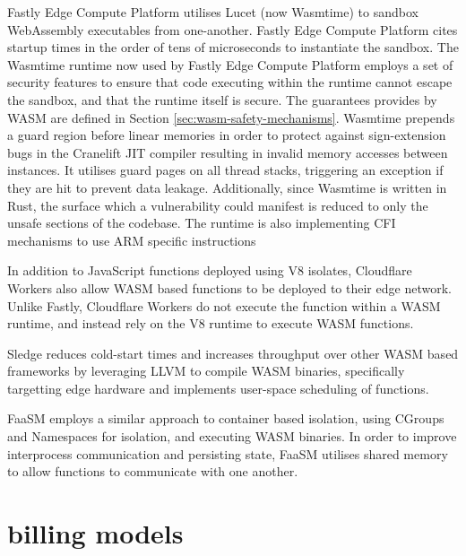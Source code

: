Fastly Edge Compute Platform\cite{EdgeCloudPlatform} utilises Lucet\cite{BytecodeallianceLucet2024} (now Wasmtime\cite{Wasmtime}) to sandbox WebAssembly executables from one-another. Fastly Edge Compute Platform cites startup times in the order of tens of microseconds to instantiate the sandbox. The Wasmtime runtime now used by Fastly Edge Compute Platform employs a set of security features to ensure that code executing within the runtime cannot escape the sandbox, and that the runtime itself is secure\cite{SecurityWasmtime}. The guarantees provides by WASM are defined in Section \ref{sec:wasm-safety-mechanisms}. Wasmtime prepends a guard region before linear memories in order to protect against sign-extension bugs in the Cranelift JIT compiler resulting in invalid memory accesses between instances. It utilises guard pages on all thread stacks, triggering an exception if they are hit to prevent data leakage. Additionally, since Wasmtime is written in Rust, the surface which a vulnerability could manifest is reduced to only the unsafe sections of the codebase. The runtime is also implementing CFI mechanisms to use ARM specific instructions


In addition to JavaScript functions deployed using V8 isolates, Cloudflare Workers\cite{CloudComputingContainers2018} also allow WASM based functions to be deployed to their edge network. Unlike Fastly, Cloudflare Workers do not execute the function within a WASM runtime, and instead rely on the V8 runtime to execute WASM functions\cite{WebAssemblyWasmCloudflare2024}.

Sledge reduces cold-start times and increases throughput over other WASM based \faas{} frameworks by leveraging LLVM to compile WASM binaries, specifically targetting edge hardware and implements user-space scheduling of functions\cite{gadepalliSledgeServerlessfirstLightweight2020}.

FaaSM employs a similar approach to container based isolation, using CGroups and Namespaces for isolation, and executing WASM binaries. In order to improve interprocess communication and persisting state, FaaSM utilises shared memory to allow functions to communicate with one another\cite{shillakerFaasmLightweightIsolation2020}.

\section{\faas{} billing models}
\label{sec:faas-billing-models}

